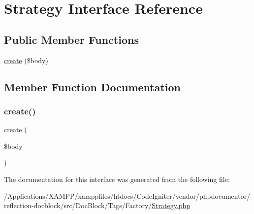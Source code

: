\hypertarget{interfacephp_documentor_1_1_reflection_1_1_doc_block_1_1_tags_1_1_factory_1_1_strategy}{}\section{Strategy Interface Reference}
\label{interfacephp_documentor_1_1_reflection_1_1_doc_block_1_1_tags_1_1_factory_1_1_strategy}
\subsection*{Public Member Functions}
\begin{DoxyCompactItemize}
\item 
\mbox{\hyperlink{interfacephp_documentor_1_1_reflection_1_1_doc_block_1_1_tags_1_1_factory_1_1_strategy_ab6d6d4ec048fcf0c2050a4a4190e1dfb}{create}} (\$body)
\end{DoxyCompactItemize}


\subsection{Member Function Documentation}
\mbox{\label{interfacephp_documentor_1_1_reflection_1_1_doc_block_1_1_tags_1_1_factory_1_1_strategy_ab6d6d4ec048fcf0c2050a4a4190e1dfb}} 
\subsubsection{\texorpdfstring{create()}{create()}}
{\footnotesize\ttfamily create (\begin{DoxyParamCaption}\item[{}]{\$body }\end{DoxyParamCaption})}



The documentation for this interface was generated from the following file\+:\begin{DoxyCompactItemize}
\item 
/\+Applications/\+X\+A\+M\+P\+P/xamppfiles/htdocs/\+Code\+Igniter/vendor/phpdocumentor/reflection-\/docblock/src/\+Doc\+Block/\+Tags/\+Factory/\mbox{\hyperlink{_strategy_8php}{Strategy.\+php}}\end{DoxyCompactItemize}
